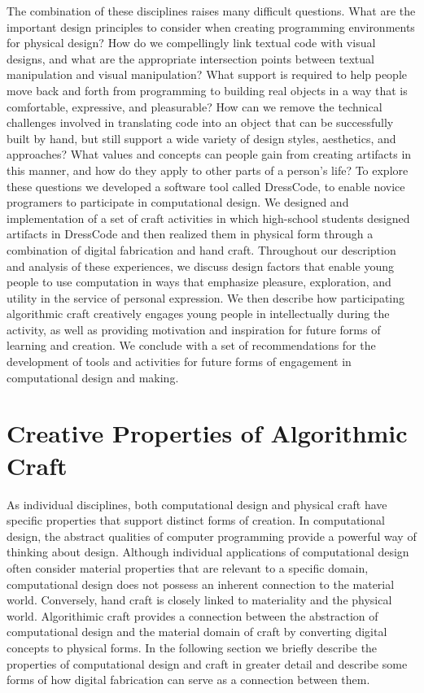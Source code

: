 \documentclass{sigchi}
\begin{document}
The combination of these disciplines raises many difficult questions. What are the important design principles to consider when creating programming environments for physical design? How do we compellingly link textual code with visual designs, and what are the appropriate intersection points between textual manipulation and visual manipulation? What support is required to help people move back and forth from programming to building real objects in a way that is comfortable, expressive, and pleasurable? How can we remove the technical challenges involved in translating code into an object that can be successfully built by hand, but still support a wide variety of design styles, aesthetics, and approaches? What values and concepts can people gain from creating artifacts in this manner, and how do they apply to other parts of a person's life? To explore these questions we developed a software tool called DressCode, to enable novice programers to participate in computational design. We designed and implementation of a set of craft activities in which high-school students designed artifacts in DressCode and then realized them in physical form through a combination of digital fabrication and hand craft. Throughout our description and analysis of these experiences, we discuss design factors that enable young people to use computation in ways that emphasize pleasure, exploration, and utility in the service of personal expression. We then describe how participating algorithmic craft creatively engages young people in intellectually during the activity, as well as providing motivation and inspiration for future forms of learning and creation. We conclude with a set of recommendations for the development of tools and activities for future forms of engagement in computational design and making.

\section{Creative Properties of Algorithmic Craft}
As individual disciplines, both computational design and physical craft have specific properties that support distinct forms of creation. In computational design, the abstract qualities of computer programming provide a powerful way of thinking about design. Although individual applications of computational design often consider material properties that are relevant to a specific domain, computational design does not possess an inherent connection to the material world. Conversely, hand craft is closely linked to materiality and the physical world. Algorithimic craft provides a connection between the abstraction of computational design and the material domain of craft by converting digital concepts to physical forms. In the following section we briefly describe the properties of computational design and craft in greater detail and describe some forms of how digital fabrication can serve as a connection between them.
\end{document}
